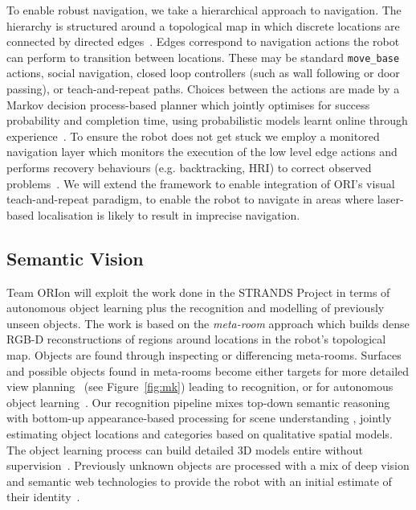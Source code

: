 \documentclass[runningheads,a4paper]{llncs}
\newcommand{\teamori}{Team ORIon}
\begin{document}
To enable robust navigation, we take a hierarchical approach to navigation. The hierarchy is structured around a topological map in which discrete locations are connected by directed edges~\cite{jpulido2015NowOrLater}. Edges correspond to navigation actions the robot can perform to transition between locations. These may be standard \texttt{move\_base} actions, social navigation, closed loop controllers (such as wall following or door passing), or teach-and-repeat paths. Choices between the actions are made by a Markov decision process-based planner which jointly optimises for success probability and completion time, using probabilistic models learnt online through experience~\cite{LPH14b}. To ensure the robot does not get stuck we employ a monitored navigation layer which monitors the execution of the low level edge actions and performs recovery behaviours (e.g. backtracking, HRI) to correct observed problems~\cite{strands@ram}. We will extend the framework to enable integration of ORI's visual teach-and-repeat paradigm, to enable the robot to navigate in areas where laser-based localisation is likely to result in imprecise navigation. 

\subsection{Semantic Vision}
\teamori{} will exploit the work done in the STRANDS Project in terms of autonomous object learning plus the recognition and modelling of previously unseen objects. The work is based on the \emph{meta-room} approach which builds dense RGB-D reconstructions of regions around locations in the robot's topological map. Objects are found through inspecting or differencing meta-rooms. Surfaces and possible objects found in meta-rooms become either targets for more detailed view planning~\cite{kunze14indirect} (see Figure~\ref{fig:mk}) leading to recognition, or for autonomous object learning~\cite{Faeulhammer:2016}. Our recognition pipeline mixes top-down semantic reasoning with bottom-up appearance-based processing for scene understanding \cite{kunze14topdown}, jointly estimating object locations and categories based on qualitative spatial models\cite{kunze14bootstrapping}. The object learning process can build detailed 3D models entire without supervision~\cite{Faeulhammer:2016}. Previously unknown objects are processed with a mix of deep vision and semantic web technologies to provide the robot with an initial estimate of their identity~\cite{aloof@icra17}.
\end{document}
